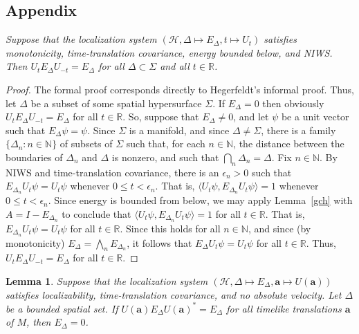 \documentclass[12pt]{article}
\newtheorem{lemma}{Lemma}
\theoremstyle{remark}
\newcommand{\hil}[1]{\mathcal{#1}}
\begin{document}
\begin{appendix}
\section{Appendix}
  {\it Suppose that the 
  localization system $(\hil{H},\Delta \mapsto E_{\Delta},t\mapsto
  U_{t})$ satisfies monotonicity, time-translation covariance, energy
  bounded below, and NIWS.  Then $U_{t}E_{\Delta}U_{-t}=E_{\Delta}$
  for all $\Delta \subset \Sigma$ and all $t\in \mathbb{R}$. }

\begin{proof} The formal proof corresponds directly to Hegerfeldt's
  informal proof.  Thus, let $\Delta$ be a subset of some spatial
  hypersurface $\Sigma$.  If $E_{\Delta}=0$ then obviously
  $U_{t}E_{\Delta}U_{-t}=E_{\Delta}$ for all $t\in \mathbb{R}$.  So,
  suppose that $E_{\Delta}\neq 0$, and let $\psi$ be a unit vector
  such that $E_{\Delta}\psi =\psi$.  Since $\Sigma$ is a manifold, and
  since $\Delta \neq \Sigma$, there is a family $\{ \Delta _{n}:n\in
  \mathbb{N} \}$ of subsets of $\Sigma$ such that, for each $n\in
  \mathbb{N}$, the distance between the boundaries of $\Delta _{n}$
  and $\Delta$ is nonzero, and such that $\bigcap _{n}\Delta
  _{n}=\Delta$.  Fix $n \in \mathbb{N}$.  By NIWS and time-translation
  covariance, there is an $\epsilon _{n}>0$ such that $E_{\Delta
    _{n}}U_{t}\psi = U_{t}\psi$ whenever $0\leq t< \epsilon _{n}$.
  That is, $\langle U_{t}\psi ,E_{\Delta _{n}}U_{t}\psi \rangle =1$
  whenever $0\leq t < \epsilon _{n}$.  Since energy is bounded from
  below, we may apply Lemma~\ref{gch} with $A=I-E_{\Delta _{n}}$ to
  conclude that $\langle U_{t}\psi ,E_{\Delta _{n}}U_{t}\psi \rangle
  =1$ for all $t\in \mathbb{R}$.  That is, $E_{\Delta _{n}}U_{t}\psi
  =U_{t}\psi$ for all $t\in \mathbb{R}$.  Since this holds for all
  $n\in \mathbb{N}$, and since (by monotonicity) $E_{\Delta}=\bigwedge
  _{n}E_{\Delta _{n}}$, it follows that $E_{\Delta}U_{t}\psi
  =U_{t}\psi$ for all $t\in \mathbb{R}$.  Thus, $U_{t}E_{\Delta
    }U_{-t}=E_{\Delta}$ for all $t\in \mathbb{R}$.
\end{proof}

\begin{lemma} Suppose that the localization system $(\hil{H},\Delta \mapsto
  E_{\Delta},\mathbf{a}\mapsto U(\mathbf{a}))$ satisfies
  localizability, time-translation covariance, and no absolute
  velocity.  Let $\Delta$ be a bounded spatial set.  If
  $U(\mathbf{a})E_{\Delta}U(\mathbf{a})^{*}=E_{\Delta}$ for all
  timelike translations $\mathbf{a}$ of $M$, then $E_{\Delta}=0$.
  \label{zowwy}
\end{lemma}


\end{appendix}
\end{document}
